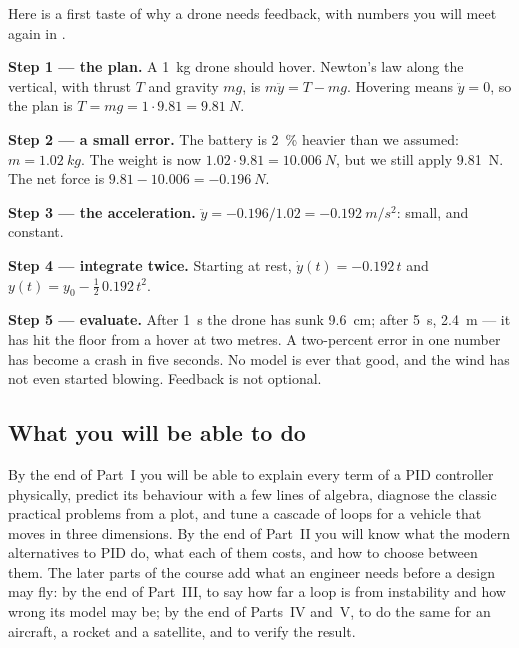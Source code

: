 \begin{example}
Here is a first taste of why a drone needs feedback, with numbers you will meet again in .

\textbf{Step 1 — the plan.} A \SI{1}{kg} drone should hover. Newton's law along the vertical, with thrust $T$ and gravity $mg$, is $m\ddot y = T - mg$. Hovering means $\ddot y = 0$, so the plan is $T = mg = 1 \cdot 9.81 = \SI{9.81}{N}$.

\textbf{Step 2 — a small error.} The battery is \SI{2}{\%} heavier than we assumed: $m = \SI{1.02}{kg}$. The weight is now $1.02 \cdot 9.81 = \SI{10.006}{N}$, but we still apply \SI{9.81}{N}. The net force is $9.81 - 10.006 = \SI{-0.196}{N}$.

\textbf{Step 3 — the acceleration.} $\ddot y = -0.196/1.02 = \SI{-0.192}{m/s^2}$: small, and constant.

\textbf{Step 4 — integrate twice.} Starting at rest, $\dot y(t) = -0.192\,t$ and $y(t) = y_0 - \tfrac12\,0.192\,t^2$.

\textbf{Step 5 — evaluate.} After \SI{1}{s} the drone has sunk \SI{9.6}{cm}; after \SI{5}{s}, \SI{2.4}{m} — it has hit the floor from a hover at two metres. A two-percent error in one number has become a crash in five seconds. No model is ever that good, and the wind has not even started blowing. Feedback is not optional.
\end{example}

\subsection{What you will be able to do}
By the end of Part~I you will be able to explain every term of a PID controller physically, predict its behaviour with a few lines of algebra, diagnose the classic practical problems from a plot, and tune a cascade of loops for a vehicle that moves in three dimensions. By the end of Part~II you will know what the modern alternatives to PID do, what each of them costs, and how to choose between them. The later parts of the course add what an engineer needs before a design may fly: by the end of Part~III, to say how far a loop is from instability and how wrong its model may be; by the end of Parts~IV and~V, to do the same for an aircraft, a rocket and a satellite, and to verify the result.

